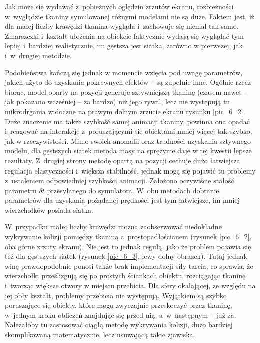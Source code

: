 		
		Jak może się wydawać z~pobieżnych oględzin zrzutów ekranu, rozbieżności w~wyglądzie tkaniny symulowanej różnymi modelami nie są duże. Faktem jest, iż dla małej liczby krawędzi tkanina wygląda i~zachowuje się niemal tak samo. Zmarszczki i~kształt ułożenia na obiekcie faktycznie wydają się wyglądać tym lepiej i~bardziej realistycznie, im gęstsza jest siatka, zarówno w pierwszej, jak i~w~drugiej metodzie. 
		
		Podobieństwa kończą się jednak w momencie wzięcia pod uwagę parametrów, jakich użyto do uzyskania pokrewnych efektów -- są zupełnie inne. Ogólnie rzecz biorąc, model oparty na pozycji generuje sztywniejszą tkaninę (czasem nawet -- jak pokazano wcześniej -- za bardzo) niż jego rywal, lecz nie występują tu mikrodrgania widoczne na prawym dolnym zrzucie ekranu rysunku \ref{pic_6_2}. Duże znaczenie ma także szybkość samej animacji tkaniny, powinna ona opadać i~reagować na interakcje z~poruszającymi się obiektami mniej więcej tak szybko, jak w rzeczywistości. Mimo swoich anomalii oraz trudności uzyskania sztywnego modelu, dla gęstszych siatek metoda masy na sprężynie daje w tej kwestii lepsze rezultaty. Z~drugiej strony metodę opartą na pozycji cechuje dużo łatwiejsza regulacja elastyczności i~większa stabilność, jednak mogą się pojawić tu problemy z~ustaleniem odpowiedniej szybkości animacji. Założono oczywiście stałość parametru \(\delta t \) przesyłanego do symulatora. W~obu metodach dobranie parametrów dla uzyskania pożądanej prędkości jest tym łatwiejsze, im mniej wierzchołków posiada siatka.
		
		W~przypadku małej liczby krawędzi można zaobserwować niedokładne wykrywanie kolizji pomiędzy tkaniną a~prostopadłościanem (rysunek \ref{pic_6_2}, oba górne zrzuty ekranu). Nie jest to jednak regułą, jako że problem pojawia się też dla gęstszych siatek (rysunek \ref{pic_6_3}, lewy dolny obrazek). Tutaj jednak winę prawdopodobnie ponosi także brak implementacji siły tarcia, co sprawia, że wierzchołki prześlizgują się po prostych ściankach obiektu, rozciągając tkaninę i~tworząc większe otwory w miejscu przebicia. Dla sfery okalającej, ze względu na jej obły kształt, problemy przebicia nie występują. Wyjątkiem są szybko poruszające się obiekty, które mogą zwyczajnie przeskoczyć przez tkaninę, w~jednym kroku obliczeń znajdując się przed nią, a~w~następnym -- już za. Należałoby tu zastosować ciągłą metodę wykrywania kolizji, dużo bardziej skomplikowaną matematycznie, lecz usuwającą takie zjawiska.
		
